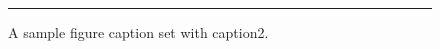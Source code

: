 \documentclass{article}
\begin{document}
\begin{figure}
\centering
\rule{4cm}{2cm}
\caption{A sample figure caption set with caption2.}
\end{figure}
\end{document}

